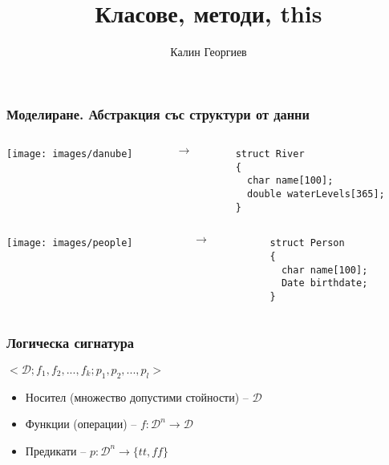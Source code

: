 \documentclass{beamer}
\begin{document}
\title[Обектно ориентирано програмиране]{Класове, методи, this}
\author{Калин Георгиев}
\frame{\titlepage}


\begin{frame}[fragile]
\frametitle{Моделиране. Абстракция със структури от данни}


\begin{columns}[c]
  \begin{column}{0.4\textwidth}
  \texttt{[image: images/danube]}
  \end{column}
  \begin{column}{0.1\textwidth}
  $\rightarrow$
  \end{column}
  \begin{column}{0.4\textwidth}
\begin{flushleft}
\begin{lstlisting}
struct River
{
  char name[100];
  double waterLevels[365];
}
\end{lstlisting}
\end{flushleft}
  \end{column}
\end{columns}


\vspace{30px}

\begin{columns}[c]
  \begin{column}{0.4\textwidth}
  \texttt{[image: images/people]}
  \end{column}
  \begin{column}{0.1\textwidth}
  $\rightarrow$
  \end{column}
  \begin{column}{0.4\textwidth}
\begin{flushleft}
\begin{lstlisting}
struct Person
{
  char name[100];
  Date birthdate;
}
\end{lstlisting}
\end{flushleft}
  \end{column}
\end{columns}


\end{frame}



\begin{frame}[fragile]
\frametitle{Логическа сигнатура}


\begin{center}
$<\mathcal{D};f_1,f_2,...,f_k;p_1,p_2,...,p_l>$
\end{center}

\begin{itemize}
  \item Носител (множество допустими стойности) -- $\mathcal{D}$
  \item Функции (операции) -- $f:\mathcal{D}^{n}\rightarrow\mathcal{D}$
  \item Предикати -- $p:\mathcal{D}^{n}\rightarrow\{tt,ff\}$
\end{itemize}

\end{frame}
\end{document}
